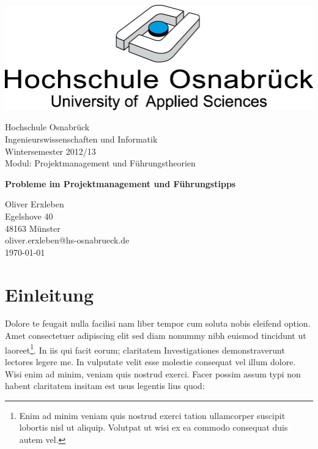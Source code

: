 \documentclass[a4paper,12pt]{scrartcl}
\begin{document}
\begin{titlepage}
\begin{flushright}
	\includegraphics[scale=0.8,keepaspectratio]{img/hs_os.png}
\end{flushright}

\begin{flushleft}
\vfill{
Hochschule Osnabrück\\ 
Ingenieurswissenschaften und Informatik \\ 
Wintersemester 2012/13} \\
Modul: Projektmanagement und Führungstheorien
\end{flushleft}

\begin{center}
\begin{Large}
\vfill{\textsf{\textbf{
Probleme im Projektmanagement und Führungstipps }}}
\end{Large}
\end{center}

\begin{small}
\vfill Oliver Erxleben \\ Egelshove 40 \\  48163 Münster \\  oliver.erxleben@hs-osnabrueck.de\\ 
\today
\end{small}

\end{titlepage}


\tableofcontents
\thispagestyle{empty}

\clearpage

\onehalfspacing

\pagestyle{plain}


\section{Einleitung}
Dolore te feugait nulla facilisi nam liber tempor cum soluta nobis eleifend option. Amet consectetuer adipiscing elit sed diam nonummy nibh euismod tincidunt ut laoreet\footnote{Enim ad minim veniam quis nostrud exerci tation ullamcorper suscipit lobortis nisl ut aliquip. Volutpat ut wisi ex ea commodo consequat duis autem vel. }. In iis qui facit eorum; claritatem Investigationes demonstraverunt lectores legere me. In vulputate velit esse molestie consequat vel illum dolore. Wisi enim ad minim, veniam quis nostrud exerci. Facer possim assum typi non habent claritatem insitam est usus legentis lius quod:
\end{document}

